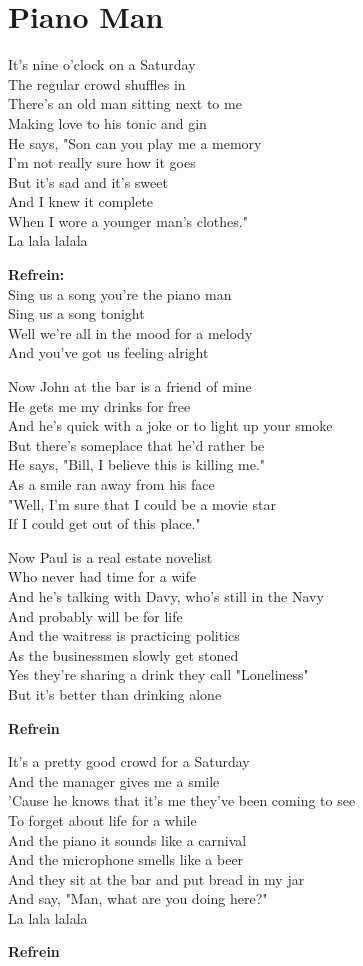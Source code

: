 \section{Piano Man}
It's nine o'clock on a Saturday\\
The regular crowd shuffles in\\
There's an old man sitting next to me\\
Making love to his tonic and gin\\
He says, "Son can you play me a memory\\
I'm not really sure how it goes\\
But it's sad and it's sweet\\
And I knew it complete\\
When I wore a younger man's clothes."\\
La lala lalala

\textbf{Refrein:}\\
Sing us a song you're the piano man\\
Sing us a song tonight\\
Well we're all in the mood for a melody\\
And you've got us feeling alright

Now John at the bar is a friend of mine\\
He gets me my drinks for free\\
And he's quick with a joke or to light up your smoke\\
But there's someplace that he'd rather be\\
He says, "Bill, I believe this is killing me."\\
As a smile ran away from his face\\
"Well, I'm sure that I could be a movie star\\
If I could get out of this place."

Now Paul is a real estate novelist\\
Who never had time for a wife\\
And he's talking with Davy, who's still in the Navy\\
And probably will be for life\\
And the waitress is practicing politics\\
As the businessmen slowly get stoned\\
Yes they're sharing a drink they call "Loneliness"\\
But it's better than drinking alone

\textbf{Refrein}

It's a pretty good crowd for a Saturday\\
And the manager gives me a smile\\
'Cause he knows that it's me they've been coming to see\\
To forget about life for a while\\
And the piano it sounds like a carnival\\
And the microphone smells like a beer\\
And they sit at the bar and put bread in my jar\\
And say, "Man, what are you doing here?"\\
La lala lalala

\textbf{Refrein} 
